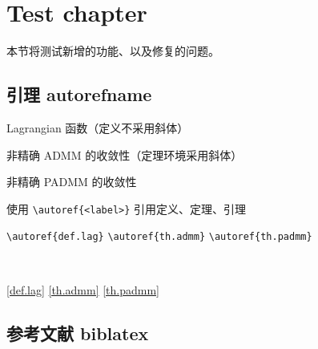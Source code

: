 \chapter{Test chapter}
本节将测试新增的功能、以及修复的问题。

\section{引理 autorefname}

\begin{definition}[Lagrangian]\label{def.lag}
    Lagrangian 函数（定义不采用斜体）
\end{definition}

\begin{theorem}[ADMM]\label{th.admm}
    非精确 ADMM 的收敛性（定理环境采用斜体）
\end{theorem}

\begin{lemma}[PADMM]\label{th.padmm}
    非精确 PADMM 的收敛性
\end{lemma}

使用 \verb|\autoref{<label>}| 引用定义、定理、引理

\vspace{10bp}

\begin{minipage}{.3\textwidth}
    \verb|\autoref{def.lag}|\newline
    \verb|\autoref{th.admm}|\newline
    \verb|\autoref{th.padmm}|
\end{minipage}
~~~~
\begin{minipage}{.3\textwidth}
    \autoref{def.lag}\newline
    \autoref{th.admm}\newline
    \autoref{th.padmm}
\end{minipage}


\section{参考文献 biblatex}

